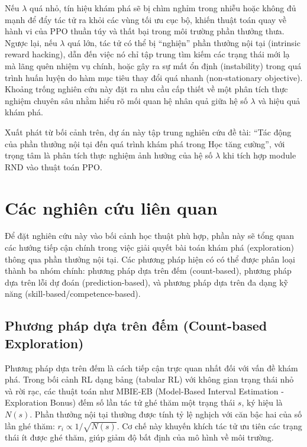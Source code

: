 \documentclass{uetgraduation}
\begin{document}
Nếu $\lambda$ quá nhỏ, tín hiệu khám phá sẽ bị chìm nghỉm trong nhiễu hoặc không đủ mạnh để đẩy tác tử ra khỏi các vùng tối ưu cục bộ, khiến thuật toán quay về hành vi của PPO thuần túy và thất bại trong môi trường phần thưởng thưa. Ngược lại, nếu $\lambda$ quá lớn, tác tử có thể bị ``nghiện'' phần thưởng nội tại (intrinsic reward hacking), dẫn đến việc nó chỉ tập trung tìm kiếm các trạng thái mới lạ mà lãng quên nhiệm vụ chính, hoặc gây ra sự mất ổn định (instability) trong quá trình huấn luyện do hàm mục tiêu thay đổi quá nhanh (non-stationary objective). Khoảng trống nghiên cứu này đặt ra nhu cầu cấp thiết về một phân tích thực nghiệm chuyên sâu nhằm hiểu rõ mối quan hệ nhân quả giữa hệ số $\lambda$ và hiệu quả khám phá.

Xuất phát từ bối cảnh trên, dự án này tập trung nghiên cứu đề tài: ``Tác động của phần thưởng nội tại đến quá trình khám phá trong Học tăng cường'', với trọng tâm là phân tích thực nghiệm ảnh hưởng của hệ số $\lambda$ khi tích hợp module RND vào thuật toán PPO.

\section{Các nghiên cứu liên quan}

Để đặt nghiên cứu này vào bối cảnh học thuật phù hợp, phần này sẽ tổng quan các hướng tiếp cận chính trong việc giải quyết bài toán khám phá (exploration) thông qua phần thưởng nội tại. Các phương pháp hiện có có thể được phân loại thành ba nhóm chính: phương pháp dựa trên đếm (count-based), phương pháp dựa trên lỗi dự đoán (prediction-based), và phương pháp dựa trên đa dạng kỹ năng (skill-based/competence-based).

\subsection{Phương pháp dựa trên đếm (Count-based Exploration)}

Phương pháp dựa trên đếm là cách tiếp cận trực quan nhất đối với vấn đề khám phá. Trong bối cảnh RL dạng bảng (tabular RL) với không gian trạng thái nhỏ và rời rạc, các thuật toán như MBIE-EB (Model-Based Interval Estimation - Exploration Bonus) đếm số lần tác tử ghé thăm một trạng thái $s$, ký hiệu là $N(s)$. Phần thưởng nội tại thường được tính tỷ lệ nghịch với căn bậc hai của số lần ghé thăm: $r_i \propto 1/\sqrt{N(s)}$. Cơ chế này khuyến khích tác tử ưu tiên các trạng thái ít được ghé thăm, giúp giảm độ bất định của mô hình về môi trường.
\end{document}
